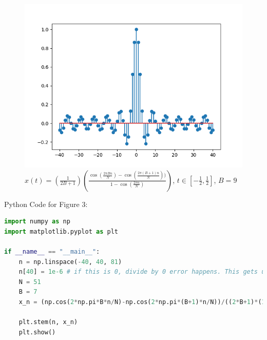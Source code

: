 \documentclass[12pt]{article}
\begin{document}
\begin{enumerate}
\begin{figure}[h]
    \caption{
        $x(t)=(\frac{1}{2B+1})(\frac{\cos(\frac{2\pi Bn}{N})-\cos(\frac{2\pi(B+1)n}{N}))}{1-\cos(\frac{2\pi n}{N})})$, 
        $t\in[-\frac{1}{2}, \frac{1}{2}]$, $B=9$
        }
    \centering
    \includegraphics[scale=0.6]{1-5c.png}
\end{figure}

\noindent Python Code for Figure 3:

\begin{lstlisting}[language=Python]
import numpy as np
import matplotlib.pyplot as plt

if __name__ == "__main__":
    n = np.linspace(-40, 40, 81)
    n[40] = 1e-6 # if this is 0, divide by 0 error happens. This gets us close
    N = 51
    B = 7
    x_n = (np.cos(2*np.pi*B*n/N)-np.cos(2*np.pi*(B+1)*n/N))/((2*B+1)*(1.-np.cos(2*np.pi*n/N)))

    plt.stem(n, x_n)
    plt.show()
\end{lstlisting}
\newpage

\end{enumerate}
 
\end{document}
